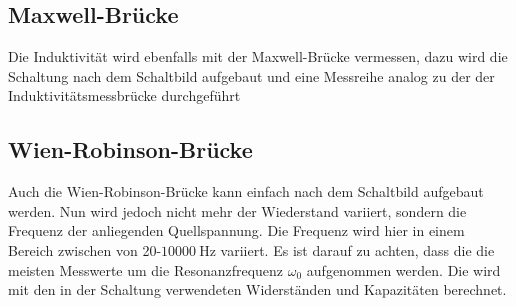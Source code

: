     \subsection{Maxwell-Brücke}

        \noindent Die Induktivität wird ebenfalls mit der Maxwell-Brücke vermessen, dazu wird die Schaltung nach dem Schaltbild aufgebaut und 
        eine Messreihe analog zu der der Induktivitätsmessbrücke durchgeführt



    \subsection{Wien-Robinson-Brücke}

        \noindent Auch die Wien-Robinson-Brücke kann einfach nach dem Schaltbild aufgebaut werden. Nun wird jedoch nicht mehr der Wiederstand variiert, 
        sondern die Frequenz der anliegenden Quellspannung. Die Frequenz wird hier in einem Bereich zwischen von 20-$\SI{10000}{\hertz}$ variiert. Es ist 
        darauf zu achten, dass die die meisten Messwerte um die Resonanzfrequenz $\omega_0$ aufgenommen werden. Die wird mit den in der 
        Schaltung verwendeten Widerständen und Kapazitäten berechnet.

